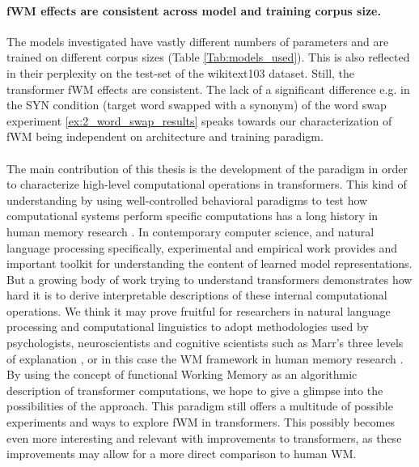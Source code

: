 \paragraph{fWM effects are consistent across model and training corpus size.} The models investigated have vastly different numbers of parameters and are trained on different corpus sizes (Table \ref{Tab:models_used}).
This is also reflected in their perplexity on the test-set of the wikitext103 dataset.
Still, the transformer fWM effects are consistent. The lack of a significant difference e.g. in the SYN condition (target word swapped with a synonym) of the word swap experiment \ref{ex:2_word_swap_results} speaks towards our characterization of fWM being independent on architecture and training paradigm.

\paragraph{} The main contribution of this thesis is the development of the paradigm in order to characterize high-level computational operations in transformers.
This kind of understanding by using well-controlled behavioral paradigms to test how computational systems perform specific computations has a long history in human memory research \parencite{oberauer_benchmarks_2018}.
In contemporary computer science, and natural language processing specifically, experimental and empirical work provides and important toolkit for understanding the content of learned model representations.
But a growing body of work trying to understand transformers \parencite{rogers_primer_2020} demonstrates how hard it is to derive interpretable descriptions of these internal computational operations.
We think it may prove fruitful for researchers in natural language processing and computational linguistics to adopt methodologies used by psychologists, neuroscientists and cognitive scientists such as Marr's three levels of explanation \parencite{marr_vision_1982}, or in this case the WM framework in human memory research \parencite{baddeley_working_2003}.
By using the concept of functional Working Memory as an algorithmic description of transformer computations, we hope to give a glimpse into the possibilities of the approach.
This paradigm still offers a multitude of possible experiments and ways to explore fWM in transformers.
This possibly becomes even more interesting and relevant with improvements to transformers, as these improvements may allow for a more direct comparison to human WM.


